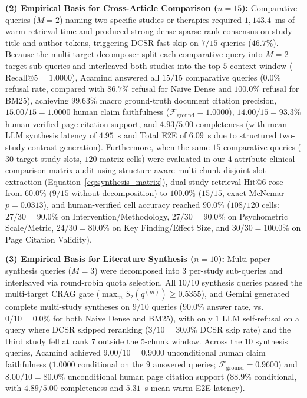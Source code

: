 \documentclass[10pt]{SPIIRAS_Proceedings}
\begin{document}
\textbf{(2) Empirical Basis for Cross-Article Comparison ($n = 15$):} Comparative queries ($M = 2$) naming two specific studies or therapies required $1,143.4$~ms of warm retrieval time and produced strong dense-sparse rank consensus on study title and author tokens, triggering DCSR fast-skip on $7/15$ queries ($46.7\%$). Because the multi-target decomposer split each comparative query into $M = 2$ target sub-queries and interleaved both studies into the top-$5$ context window ($\mathrm{Recall@5} = 1.0000$), Acamind answered all $15/15$ comparative queries ($0.0\%$ refusal rate, compared with $86.7\%$ refusal for Naive Dense and $100.0\%$ refusal for BM25), achieving $99.63\%$ macro ground-truth document citation precision, $15.00 / 15 = 1.0000$ human claim faithfulness ($\mathcal{F}_{\mathrm{ground}} = 1.0000$), $14.00 / 15 = 93.3\%$ human-verified page citation support, and $4.93 / 5.00$ completeness (with mean LLM synthesis latency of $4.95$~s and Total E2E of $6.09$~s due to structured two-study contrast generation). Furthermore, when the same $15$ comparative queries ($30$ target study slots, $120$ matrix cells) were evaluated in our 4-attribute clinical comparison matrix audit using structure-aware multi-chunk disjoint slot extraction (Equation~\ref{eq:synthesis_matrix}), dual-study retrieval $\mathrm{Hit@6}$ rose from $60.0\%$ ($9/15$ without decomposition) to $100.0\%$ ($15/15$, exact McNemar $p = 0.0313$), and human-verified cell accuracy reached $90.0\%$ ($108/120$ cells: $27/30 = 90.0\%$ on Intervention/Methodology, $27/30 = 90.0\%$ on Psychometric Scale/Metric, $24/30 = 80.0\%$ on Key Finding/Effect Size, and $30/30 = 100.0\%$ on Page Citation Validity).

\textbf{(3) Empirical Basis for Literature Synthesis ($n = 10$):} Multi-paper synthesis queries ($M = 3$) were decomposed into $3$ per-study sub-queries and interleaved via round-robin quota selection. All $10/10$ synthesis queries passed the multi-target CRAG gate ($\max_m S_2(q^{(m)}) \ge 0.5355$), and Gemini generated complete multi-study syntheses on $9/10$ queries ($90.0\%$ answer rate, vs.\ $0/10 = 0.0\%$ for both Naive Dense and BM25), with only $1$ LLM self-refusal on a query where DCSR skipped reranking ($3/10 = 30.0\%$ DCSR skip rate) and the third study fell at rank 7 outside the 5-chunk window. Across the $10$ synthesis queries, Acamind achieved $9.00 / 10 = 0.9000$ unconditional human claim faithfulness ($1.0000$ conditional on the $9$ answered queries; $\mathcal{F}_{\mathrm{ground}} = 0.9600$) and $8.00 / 10 = 80.0\%$ unconditional human page citation support ($88.9\%$ conditional, with $4.89 / 5.00$ completeness and $5.31$~s mean warm E2E latency).
\end{document}
